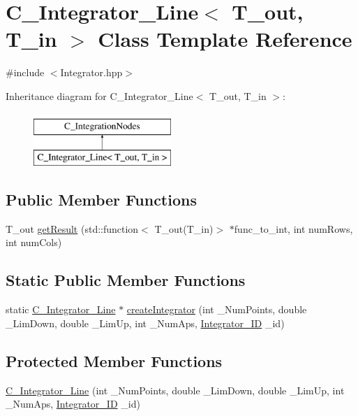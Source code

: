 \hypertarget{class_c___integrator___line}{\section{C\-\_\-\-Integrator\-\_\-\-Line$<$ T\-\_\-out, T\-\_\-in $>$ Class Template Reference}
\label{class_c___integrator___line}
}


{\ttfamily \#include $<$Integrator.\-hpp$>$}

Inheritance diagram for C\-\_\-\-Integrator\-\_\-\-Line$<$ T\-\_\-out, T\-\_\-in $>$\-:\begin{figure}[H]
\begin{center}
\leavevmode
\includegraphics[height=2.000000cm]{class_c___integrator___line}
\end{center}
\end{figure}
\subsection*{Public Member Functions}
\begin{DoxyCompactItemize}
\item 
T\-\_\-out \hyperlink{class_c___integrator___line_afdd5b25eefd9986601bf3221b67e8c72}{get\-Result} (std\-::function$<$ T\-\_\-out(T\-\_\-in)$>$ $\ast$func\-\_\-to\-\_\-int, int num\-Rows, int num\-Cols)
\end{DoxyCompactItemize}
\subsection*{Static Public Member Functions}
\begin{DoxyCompactItemize}
\item 
static \hyperlink{class_c___integrator___line}{C\-\_\-\-Integrator\-\_\-\-Line} $\ast$ \hyperlink{class_c___integrator___line_a39a1ca043cff260ffe3fa4e7bc61c5e7}{create\-Integrator} (int \-\_\-\-Num\-Points, double \-\_\-\-Lim\-Down, double \-\_\-\-Lim\-Up, int \-\_\-\-Num\-Aps, \hyperlink{_integration_nodes_8hpp_a8a2a136fba71c4785a5bdfe3e0e23b2b}{Integrator\-\_\-\-I\-D} \-\_\-id)
\end{DoxyCompactItemize}
\subsection*{Protected Member Functions}
\begin{DoxyCompactItemize}
\item 
\hyperlink{class_c___integrator___line_a296717ff620c356cbe2b16b3cca73d16}{C\-\_\-\-Integrator\-\_\-\-Line} (int \-\_\-\-Num\-Points, double \-\_\-\-Lim\-Down, double \-\_\-\-Lim\-Up, int \-\_\-\-Num\-Aps, \hyperlink{_integration_nodes_8hpp_a8a2a136fba71c4785a5bdfe3e0e23b2b}{Integrator\-\_\-\-I\-D} \-\_\-id)
\end{DoxyCompactItemize}
